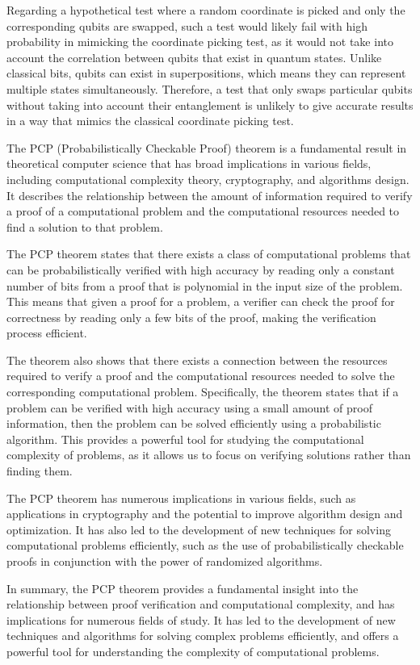 Regarding a hypothetical test where a random coordinate is picked and only the corresponding qubits are swapped, such a test would likely fail with high probability in mimicking the coordinate picking test, as it would not take into account the correlation between qubits that exist in quantum states. Unlike classical bits, qubits can exist in superpositions, which means they can represent multiple states simultaneously. Therefore, a test that only swaps particular qubits without taking into account their entanglement is unlikely to give accurate results in a way that mimics the classical coordinate picking test.

The PCP (Probabilistically Checkable Proof) theorem is a fundamental result in theoretical computer science that has broad implications in various fields, including computational complexity theory, cryptography, and algorithms design. It describes the relationship between the amount of information required to verify a proof of a computational problem and the computational resources needed to find a solution to that problem.

The PCP theorem states that there exists a class of computational problems that can be probabilistically verified with high accuracy by reading only a constant number of bits from a proof that is polynomial in the input size of the problem. This means that given a proof for a problem, a verifier can check the proof for correctness by reading only a few bits of the proof, making the verification process efficient.

The theorem also shows that there exists a connection between the resources required to verify a proof and the computational resources needed to solve the corresponding computational problem. Specifically, the theorem states that if a problem can be verified with high accuracy using a small amount of proof information, then the problem can be solved efficiently using a probabilistic algorithm. This provides a powerful tool for studying the computational complexity of problems, as it allows us to focus on verifying solutions rather than finding them.

The PCP theorem has numerous implications in various fields, such as applications in cryptography and the potential to improve algorithm design and optimization. It has also led to the development of new techniques for solving computational problems efficiently, such as the use of probabilistically checkable proofs in conjunction with the power of randomized algorithms.

In summary, the PCP theorem provides a fundamental insight into the relationship between proof verification and computational complexity, and has implications for numerous fields of study. It has led to the development of new techniques and algorithms for solving complex problems efficiently, and offers a powerful tool for understanding the complexity of computational problems.


